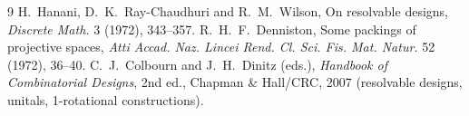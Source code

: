 \documentclass[11pt]{article}
\theoremstyle{definition}
\theoremstyle{remark}
\begin{document}
\begin{thebibliography}{9}
 H.~Hanani, D.~K.~Ray-Chaudhuri and R.~M.~Wilson, On resolvable designs,
\emph{Discrete Math.} 3 (1972), 343--357.
 R.~H.~F.~Denniston, Some packings of projective spaces,
\emph{Atti Accad. Naz. Lincei Rend. Cl. Sci. Fis. Mat. Natur.} 52 (1972), 36--40.
 C.~J.~Colbourn and J.~H.~Dinitz (eds.), \emph{Handbook of Combinatorial
Designs}, 2nd ed., Chapman \& Hall/CRC, 2007 (resolvable designs, unitals, 1-rotational
constructions).
\end{thebibliography}
\end{document}
